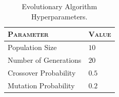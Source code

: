 \begin{table}
    \centering
    \begin{tabular}{ll}
        \toprule
        \textsc{Parameter}    & \textsc{Value} \\
        \midrule
        Population Size       & $10$           \\
        Number of Generations & $20$           \\
        Crossover Probability & $0.5$          \\
        Mutation Probability  & $0.2$          \\
        \bottomrule
    \end{tabular}
    \caption{Evolutionary Algorithm Hyperparameters.}
\end{table}
